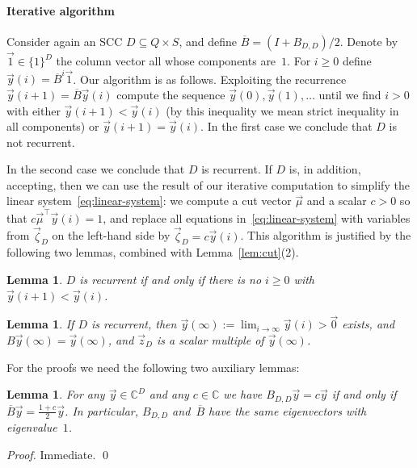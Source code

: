 \documentclass{elsarticle}
\newtheorem{lemma}[definition]{Lemma}
\newcommand{\vzero}{\vec{0}}\newcommand{\vone}{\vec{1}}\newcommand{\tB}{\overline{B}}
\begin{document}
\paragraph{Iterative algorithm}

Consider again an SCC $D \subseteq Q \times S$, and define $\tB = (I + B_{D,D})/2$.
Denote by $\vone \in \{1\}^D$ the column vector all whose components are~$1$.
For $i \geqslant 0$ define $\vec{y}(i) = \tB^i \vone$.
Our algorithm is as follows.
Exploiting the recurrence $\vec{y}(i+1) = \tB \vec{y}(i)$ compute the sequence
$\vec{y}(0), \vec{y}(1), \ldots$ until we find $i > 0$ with either $\vec{y}(i+1)
< \vec{y}(i)$ (by this inequality we mean strict inequality in all components)
or $\vec{y}(i+1) = \vec{y}(i)$.
In the first case we conclude that $D$ is not recurrent. 

In the second case we conclude that $D$ is recurrent.
If $D$ is, in addition, accepting, then we can use the result of our iterative computation to simplify the linear system~\eqref{eq:linear-system}:
we compute a cut vector $\vec{\mu}$ and a scalar $c > 0$ so that $c \vec{\mu}^\top \vec{y}(i) = 1$, and replace all equations in~\eqref{eq:linear-system} with variables from $\vec{\zeta}_D$ on the left-hand side by $\vec{\zeta}_D = c \vec{y}(i)$.
This algorithm is justified by the following two lemmas, combined with Lemma~\ref{lem:cut}(2).

\begin{lemma} \label{lem-iter-zero-new}
$D$ is recurrent if and only if there is no $i \geqslant 0$ with
    $\vec{y}(i+1) < \vec{y}(i)$.
\end{lemma}

\begin{lemma} \label{lem-iter-pos-new}
If $D$ is recurrent, then $\vec{y}(\infty) := \lim_{i \to \infty}
    \vec{y}(i) > \vzero$ exists, and $B \vec{y}(\infty) = \vec{y}(\infty)$, and
    $\vec{z}_D$ is a scalar multiple of $\vec{y}(\infty)$.
\end{lemma}

For the proofs we need the following two auxiliary lemmas:
\begin{lemma} \label{lem-iter-aux-new}
    For any $\vec{y} \in \mathbb{C}^D$ and any $c \in \mathbb{C}$ we have $B_{D,D}
    \vec{y} = c \vec{y}$ if
    and only if $\tB \vec{y} = \frac{1+c}{2} \vec{y}$.
    In particular, $B_{D,D}$ and~$\tB$ have the same eigenvectors with eigenvalue~$1$.
\end{lemma}
\begin{proof}
Immediate.
\qed
\end{proof}
\end{document}
